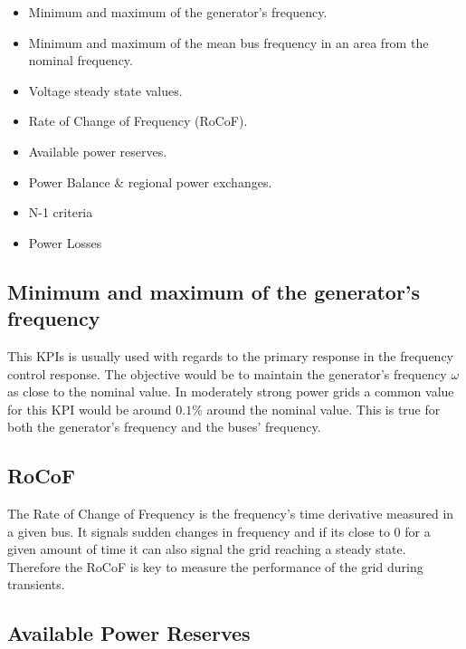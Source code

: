 \documentclass{article}
\begin{document}
\begin{itemize}
    \item Minimum and maximum of the generator's frequency.
    \item Minimum and maximum of the mean bus frequency in an area from the nominal frequency.
    \item Voltage steady state values.
    \item Rate of Change of Frequency (RoCoF).
    \item Available power reserves.
    \item Power Balance \& regional power exchanges.
    \item N-1 criteria
    \item Power Losses
\end{itemize}


\subsection*{Minimum and maximum of the generator's frequency}

This KPIs is usually used with regards to the primary response in the frequency control response. The objective would be to maintain the generator's frequency $\omega$ as close to the nominal value. In moderately strong power grids a common value for this KPI would be around $0.1\%$ around the nominal value. This is true for both the generator's frequency and the buses' frequency.

\subsection*{RoCoF}

The Rate of Change of Frequency is the frequency's time derivative measured in a given bus. It signals sudden changes in frequency and if its close to $0$ for a given amount of time it can also signal the grid reaching a steady state. Therefore the RoCoF is key to measure the performance of the grid during transients. 

\subsection*{Available Power Reserves}
\end{document}

